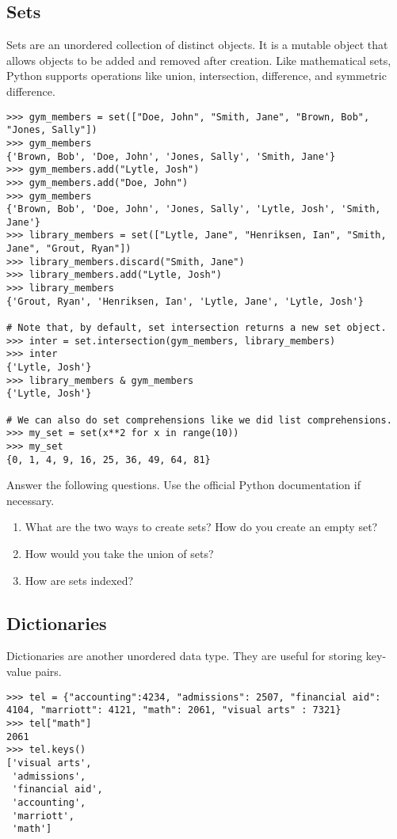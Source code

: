 \subsection*{Sets}
\begin{example}
Sets are an unordered collection of distinct objects.
It is a mutable object that allows objects to be added and removed after creation. 
Like mathematical sets, Python supports operations like union, intersection, 
difference, and symmetric difference.
\begin{lstlisting}
>>> gym_members = set(["Doe, John", "Smith, Jane", "Brown, Bob", "Jones, Sally"])
>>> gym_members
{'Brown, Bob', 'Doe, John', 'Jones, Sally', 'Smith, Jane'}
>>> gym_members.add("Lytle, Josh")
>>> gym_members.add("Doe, John")
>>> gym_members
{'Brown, Bob', 'Doe, John', 'Jones, Sally', 'Lytle, Josh', 'Smith, Jane'}
>>> library_members = set(["Lytle, Jane", "Henriksen, Ian", "Smith, Jane", "Grout, Ryan"])
>>> library_members.discard("Smith, Jane")
>>> library_members.add("Lytle, Josh") 
>>> library_members
{'Grout, Ryan', 'Henriksen, Ian', 'Lytle, Jane', 'Lytle, Josh'}

# Note that, by default, set intersection returns a new set object.
>>> inter = set.intersection(gym_members, library_members)
>>> inter
{'Lytle, Josh'}
>>> library_members & gym_members
{'Lytle, Josh'}

# We can also do set comprehensions like we did list comprehensions.
>>> my_set = set(x**2 for x in range(10))
>>> my_set
{0, 1, 4, 9, 16, 25, 36, 49, 64, 81}
\end{lstlisting}
\end{example}

\begin{problem}
Answer the following questions. Use the official Python documentation if necessary.
\begin{enumerate}
\item What are the two ways to create sets? How do you create an empty set?
\item How would you take the union of sets?
\item How are sets indexed?
\end{enumerate}
\end{problem}

\subsection*{Dictionaries}
\begin{example}
Dictionaries are another unordered data type.  They are useful for storing key-value pairs.
\begin{lstlisting}
>>> tel = {"accounting":4234, "admissions": 2507, "financial aid": 4104, "marriott": 4121, "math": 2061, "visual arts" : 7321} 
>>> tel["math"]
2061
>>> tel.keys()
['visual arts',
 'admissions',
 'financial aid',
 'accounting',
 'marriott',
 'math'] 
\end{lstlisting}
\end{example}

